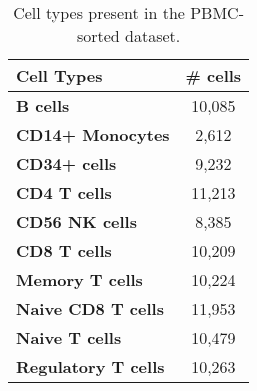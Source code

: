 
\begin{table}
\centering
\begin{small}
\begin{tabular}{lc}
    \toprule
\textbf{Cell Types}        & \textbf{\# cells} \\
\midrule
\textbf{B cells}           & 10,085   \\
\textbf{CD14+ Monocytes}   & 2,612    \\
\textbf{CD34+ cells}       & 9,232    \\
\textbf{CD4 T cells}       & 11,213   \\
\textbf{CD56 NK cells}     & 8,385    \\
\textbf{CD8 T cells}       & 10,209   \\
\textbf{Memory T cells}   & 10,224   \\
\textbf{Naive CD8 T cells} & 11,953   \\
\textbf{Naive T cells}     & 10,479   \\
\textbf{Regulatory T cells}     & 10,263   \\
\bottomrule
\end{tabular}
\end{small}
\caption{Cell types present in the PBMC-sorted dataset.}
\label{scanvipbmc-pure-celltypes}
\end{table}
